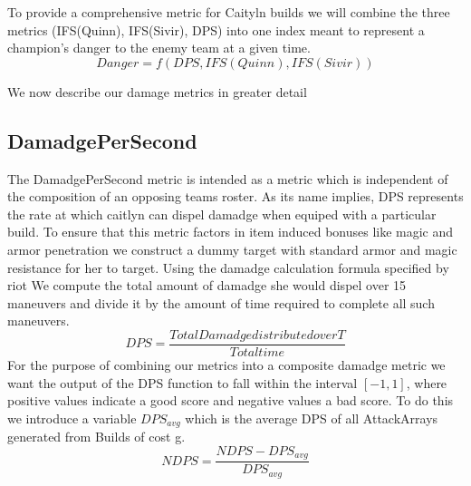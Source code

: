 \documentclass{article}
\begin{document}
To provide a comprehensive metric for Caityln builds we will combine the three metrics (IFS(Quinn), IFS(Sivir), DPS) into one index meant to represent a champion's danger to the enemy team at a given time.  
\begin{equation}
Danger = f(DPS, IFS(Quinn), IFS(Sivir))
\end{equation}

We now describe our damage metrics in greater detail

\subsection{DamadgePerSecond}
The DamadgePerSecond metric is intended as a metric which is independent of the composition of an opposing teams roster.  As its name implies, DPS represents the rate at which caitlyn can dispel damadge when equiped with a particular build.  To ensure that this metric factors in item induced bonuses like magic and armor penetration we construct a dummy target with standard armor and magic resistance for her to target.  Using the damadge calculation formula specified by riot We compute the total amount of damadge she would dispel over 15 maneuvers and divide it by the amount of time required to complete all such maneuvers.  
\begin{equation}
DPS = \frac{Total Damadge distributed over T}{Total time}
\end{equation}
For the purpose of combining our metrics into a composite damadge metric we want the output of the DPS function to fall within the interval $[-1,1]$, where positive values indicate a good score and negative values a bad score.  To do this we introduce a variable $DPS_{avg}$ which is the average DPS of all AttackArrays generated from Builds of cost  g.\\
\begin{equation}
NDPS = \frac{NDPS - DPS_{avg}}{DPS_{avg}}
\end{equation}
\end{document}
